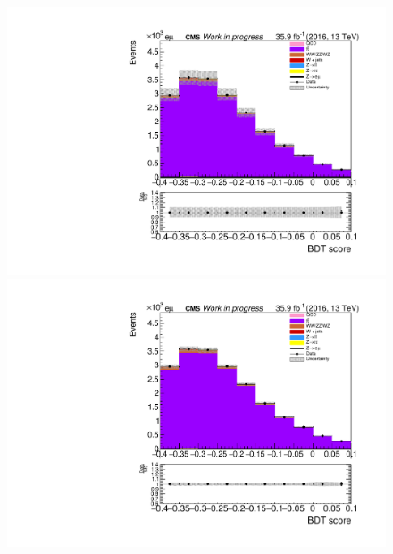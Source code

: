 \begin{figure}[htp]
	\begin{multicols}{2}
		\includegraphics[width=\linewidth]{plots/em/TT_CR_prefit.pdf}\par 
		\includegraphics[width=\linewidth]{plots/em/TT_CR_postfit.pdf}\par
	\end{multicols}	


\end{figure}
